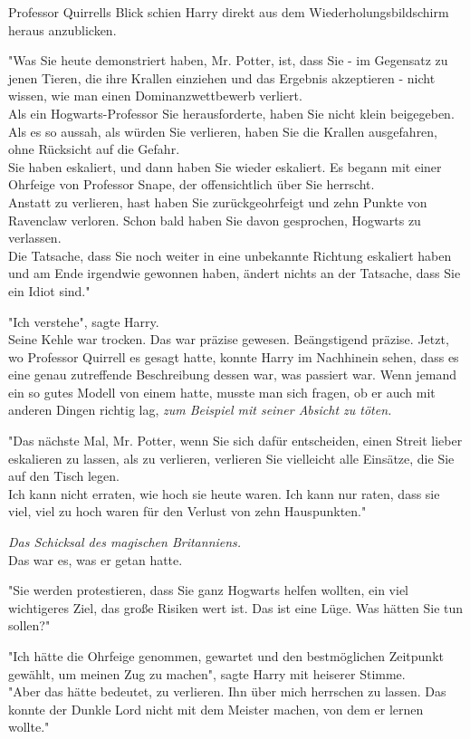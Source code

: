 {Professor Quirrells Blick schien Harry direkt aus dem Wiederholungsbildschirm heraus anzublicken.

"Was Sie heute demonstriert haben, Mr. Potter, ist, dass Sie - im Gegensatz zu jenen Tieren, die ihre Krallen einziehen und das Ergebnis akzeptieren - nicht wissen, wie man einen Dominanzwettbewerb verliert.\\ Als ein Hogwarts-Professor Sie herausforderte, haben Sie nicht klein beigegeben. Als es so aussah, als würden Sie verlieren, haben Sie die Krallen ausgefahren, ohne Rücksicht auf die Gefahr.\\ Sie haben eskaliert, und dann haben Sie wieder eskaliert. Es begann mit einer Ohrfeige von Professor Snape, der offensichtlich über Sie herrscht.\\ Anstatt zu verlieren, hast haben Sie zurückgeohrfeigt und zehn Punkte von Ravenclaw verloren. Schon bald haben Sie davon gesprochen, Hogwarts zu verlassen.\\ Die Tatsache, dass Sie noch weiter in eine unbekannte Richtung eskaliert haben und am Ende irgendwie gewonnen haben, ändert nichts an der Tatsache, dass Sie ein Idiot sind."

"Ich verstehe", sagte Harry.\\ Seine Kehle war trocken. Das war präzise gewesen. Beängstigend präzise. Jetzt, wo Professor Quirrell es gesagt hatte, konnte Harry im Nachhinein sehen, dass es eine genau zutreffende Beschreibung dessen war, was passiert war. Wenn jemand ein so gutes Modell von einem hatte, musste man sich fragen, ob er auch mit anderen Dingen richtig lag, \emph{zum Beispiel mit seiner Absicht zu töten.}

"Das nächste Mal, Mr. Potter, wenn Sie sich dafür entscheiden, einen Streit lieber eskalieren zu lassen, als zu verlieren, verlieren Sie vielleicht alle Einsätze, die Sie auf den Tisch legen.\\ Ich kann nicht erraten, wie hoch sie heute waren. Ich kann nur raten, dass sie viel, viel zu hoch waren für den Verlust von zehn Hauspunkten."

\emph{Das Schicksal des magischen Britanniens.}\\ Das war es, was er getan hatte.

"Sie werden protestieren, dass Sie ganz Hogwarts helfen wollten, ein viel wichtigeres Ziel, das große Risiken wert ist. Das ist eine Lüge. Was hätten Sie tun sollen?"

"Ich hätte die Ohrfeige genommen, gewartet und den bestmöglichen Zeitpunkt gewählt, um meinen Zug zu machen", sagte Harry mit heiserer Stimme.\\ "Aber das hätte bedeutet, zu verlieren. Ihn über mich herrschen zu lassen. Das konnte der Dunkle Lord nicht mit dem Meister machen, von dem er lernen wollte."

}
